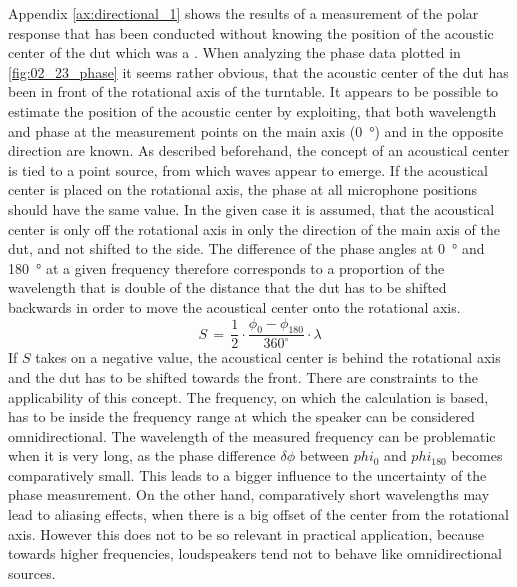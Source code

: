 Appendix \ref{ax:directional_1} shows the results of a measurement of the polar response that has been conducted without knowing the position of the acoustic center of the \gls{dut} which was a \citep{seas33}. 
When analyzing the phase data plotted in \autoref{fig:02_23_phase} it seems rather obvious, that the acoustic center of the \gls{dut} has been in front of the rotational axis of the turntable. 
It appears to be possible to estimate the position of the acoustic center by exploiting, that both wavelength and phase at the measurement points on the main axis (\SI{0}{\degree}) and in the opposite direction are known. As described beforehand, the concept of an acoustical center is tied to a  point source, from which waves appear to emerge. If the acoustical center is placed  on the rotational axis, the phase at all microphone positions should have the same value. In the given case it is assumed, that the acoustical center is only off the rotational axis in only the direction of the main axis of the \gls{dut}, and not shifted to the side.
The difference of the phase angles at \SI{0}{\degree} and \SI{180}{\degree} at a given frequency therefore corresponds to a proportion of the wavelength that is double of the distance that the \gls{dut} has to be shifted backwards in order to move the acoustical center onto the rotational axis.
\begin{equation}
S\,=\,\frac{1}{2}\cdot\frac{\phi_0-\phi_{180}}{360^\circ}\cdot\lambda
\end{equation}
\startexplain
\stopexplain    
If \(S\) takes on a negative value, the acoustical center is behind the rotational axis and the \gls{dut} has to be shifted towards the front. There are constraints to the applicability of this concept. The frequency, on which the calculation is based, has to be inside the frequency range at which the speaker can be considered omnidirectional.
The wavelength of the measured frequency can be problematic when it is very long, as the phase difference \(\delta\phi\) between \(phi_0\) and \(phi_{180}\) becomes comparatively small. This leads to a bigger influence to the uncertainty of the phase measurement. On the other hand, comparatively short wavelengths may lead to aliasing effects, when there is a big offset of the center from the rotational axis. However this does not to be so relevant in practical application, because towards higher frequencies, loudspeakers tend not to behave like omnidirectional sources.\\
